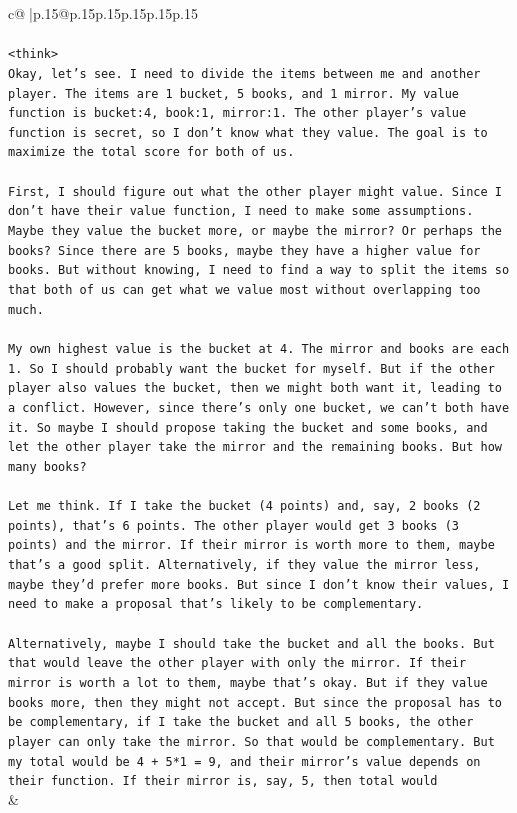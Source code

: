 \documentclass{article}
\begin{document}
{\begin{supertabular}{c@{$\;$}|p{.15\linewidth}@{}p{.15\linewidth}p{.15\linewidth}p{.15\linewidth}p{.15\linewidth}p{.15\linewidth}}
{{{\\ 
\\ 
\texttt{<think>} \\
\texttt{Okay, let's see. I need to divide the items between me and another player. The items are 1 bucket, 5 books, and 1 mirror. My value function is bucket:4, book:1, mirror:1. The other player's value function is secret, so I don't know what they value. The goal is to maximize the total score for both of us.} \\
\\ 
\texttt{First, I should figure out what the other player might value. Since I don't have their value function, I need to make some assumptions. Maybe they value the bucket more, or maybe the mirror? Or perhaps the books? Since there are 5 books, maybe they have a higher value for books. But without knowing, I need to find a way to split the items so that both of us can get what we value most without overlapping too much.} \\
\\ 
\texttt{My own highest value is the bucket at 4. The mirror and books are each 1. So I should probably want the bucket for myself. But if the other player also values the bucket, then we might both want it, leading to a conflict. However, since there's only one bucket, we can't both have it. So maybe I should propose taking the bucket and some books, and let the other player take the mirror and the remaining books. But how many books?} \\
\\ 
\texttt{Let me think. If I take the bucket (4 points) and, say, 2 books (2 points), that's 6 points. The other player would get 3 books (3 points) and the mirror. If their mirror is worth more to them, maybe that's a good split. Alternatively, if they value the mirror less, maybe they'd prefer more books. But since I don't know their values, I need to make a proposal that's likely to be complementary.} \\
\\ 
\texttt{Alternatively, maybe I should take the bucket and all the books. But that would leave the other player with only the mirror. If their mirror is worth a lot to them, maybe that's okay. But if they value books more, then they might not accept. But since the proposal has to be complementary, if I take the bucket and all 5 books, the other player can only take the mirror. So that would be complementary. But my total would be 4 + 5*1 = 9, and their mirror's value depends on their function. If their mirror is, say, 5, then total would} \\
            }
        }
    }
    & \\ \\


\end{supertabular}}
\end{document}
